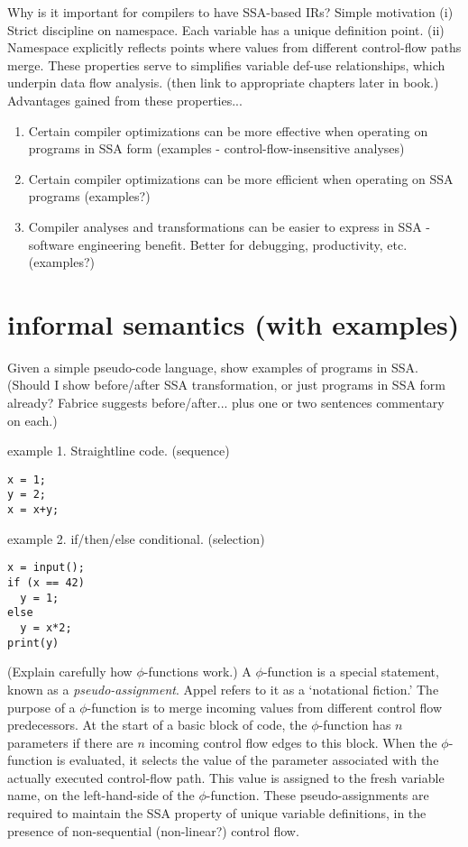 Why is it important for compilers to have SSA-based IRs? Simple motivation
(i) Strict discipline on namespace. 
Each variable has a unique definition point.
(ii) Namespace explicitly reflects points where values from
different control-flow paths merge. 
These properties serve to simplifies variable def-use relationships,
which underpin data flow analysis.
(then link to appropriate chapters later in book.)
Advantages gained from these properties...
\begin{enumerate}
\item Certain compiler optimizations can be more effective
when operating on programs in SSA form
(examples - control-flow-insensitive
analyses)
\item Certain compiler optimizations can be more efficient
when operating on SSA programs (examples?) 
\item Compiler analyses and transformations can be easier
to express in SSA - software engineering benefit. Better
for debugging, productivity, etc. (examples?)
\end{enumerate}



\section{informal semantics (with examples)}


Given a simple pseudo-code language, show examples of programs in SSA.
(Should I show before/after SSA transformation, or just programs
in SSA form already? Fabrice suggests before/after... plus
one or two sentences commentary on each.)

example 1. Straightline code. (sequence)

\begin{verbatim}
x = 1;
y = 2;
x = x+y;
\end{verbatim}

example 2. if/then/else conditional.  (selection)

\begin{verbatim}
x = input();
if (x == 42)
  y = 1;
else
  y = x*2;
print(y)
\end{verbatim}

(Explain carefully how $\phi$-functions work.) 
A $\phi$-function is a special statement, known as a
\textit{pseudo-assignment}.
Appel \cite{appelbook} refers to it as a `notational fiction.'
The purpose of a $\phi$-function is to merge
incoming values from different control flow predecessors.
At the start of a basic block of code, the $\phi$-function has
$n$ parameters if there are $n$ incoming control flow edges to this block.
When the $\phi$-function is evaluated, it selects the value
of the parameter associated  with the actually executed control-flow path.
This value is assigned to the fresh variable name, on the left-hand-side
of the $\phi$-function.
These pseudo-assignments are required to maintain the SSA property
of unique variable definitions,
in the presence of non-sequential (non-linear?) control flow.


